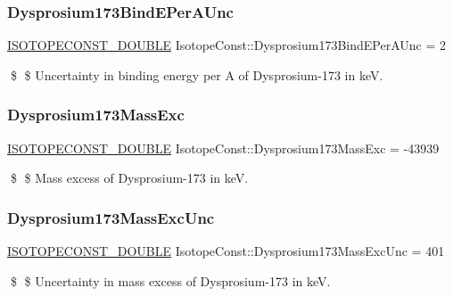 \subsubsection{\texorpdfstring{Dysprosium173\+Bind\+E\+Per\+A\+Unc}{Dysprosium173BindEPerAUnc}}
{\footnotesize\ttfamily \mbox{\hyperlink{group___isotope_const-_macros_ga8f45a7272ce02c0b4c65c44636ed719a}{I\+S\+O\+T\+O\+P\+E\+C\+O\+N\+S\+T\+\_\+\+D\+O\+U\+B\+LE}} Isotope\+Const\+::\+Dysprosium173\+Bind\+E\+Per\+A\+Unc = 2}

\$ \$ Uncertainty in binding energy per A of Dysprosium-\/173 in keV. \mbox{\label{group___isotope_const-_dysprosium-_dy173_ga3b027f1a0a8232a8fbc673824ff32a18}} 
\subsubsection{\texorpdfstring{Dysprosium173\+Mass\+Exc}{Dysprosium173MassExc}}
{\footnotesize\ttfamily \mbox{\hyperlink{group___isotope_const-_macros_ga8f45a7272ce02c0b4c65c44636ed719a}{I\+S\+O\+T\+O\+P\+E\+C\+O\+N\+S\+T\+\_\+\+D\+O\+U\+B\+LE}} Isotope\+Const\+::\+Dysprosium173\+Mass\+Exc = -\/43939}

\$ \$ Mass excess of Dysprosium-\/173 in keV. \mbox{\label{group___isotope_const-_dysprosium-_dy173_gabb93eb083d248d5bec428ba195c90f16}} 
\subsubsection{\texorpdfstring{Dysprosium173\+Mass\+Exc\+Unc}{Dysprosium173MassExcUnc}}
{\footnotesize\ttfamily \mbox{\hyperlink{group___isotope_const-_macros_ga8f45a7272ce02c0b4c65c44636ed719a}{I\+S\+O\+T\+O\+P\+E\+C\+O\+N\+S\+T\+\_\+\+D\+O\+U\+B\+LE}} Isotope\+Const\+::\+Dysprosium173\+Mass\+Exc\+Unc = 401}

\$ \$ Uncertainty in mass excess of Dysprosium-\/173 in keV. \mbox{\label{group___isotope_const-_dysprosium-_dy173_ga75cd97f50be83aae0a3b3426ad298309}} 
